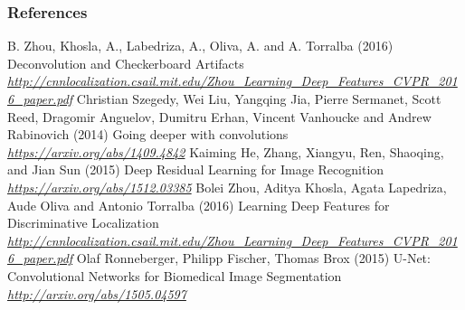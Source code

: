 
\begin{vbframe}
\frametitle{References}
\footnotesize{
\begin{thebibliography}{99}

 B. Zhou, Khosla, A., Labedriza, A., Oliva, A. and A. Torralba (2016)
\newblock Deconvolution and Checkerboard Artifacts
\newblock \emph{\url{http://cnnlocalization.csail.mit.edu/Zhou_Learning_Deep_Features_CVPR_2016_paper.pdf}}
 Christian Szegedy, Wei Liu, Yangqing Jia, Pierre Sermanet, Scott Reed, Dragomir Anguelov, Dumitru Erhan, Vincent Vanhoucke and Andrew Rabinovich (2014)
\newblock Going deeper with convolutions
\newblock \emph{\url{https://arxiv.org/abs/1409.4842}}
 Kaiming He, Zhang, Xiangyu, Ren, Shaoqing, and Jian Sun (2015)
\newblock Deep Residual Learning for Image Recognition
\newblock \emph{\url{https://arxiv.org/abs/1512.03385}}
 Bolei Zhou, Aditya Khosla, Agata Lapedriza, Aude Oliva and Antonio Torralba (2016)
\newblock Learning Deep Features for Discriminative Localization
\newblock \emph{\url{http://cnnlocalization.csail.mit.edu/Zhou_Learning_Deep_Features_CVPR_2016_paper.pdf}}
 Olaf Ronneberger, Philipp Fischer, Thomas Brox (2015)
\newblock U-Net: Convolutional Networks for Biomedical Image Segmentation
\newblock \emph{\url{http://arxiv.org/abs/1505.04597}}




\end{thebibliography}
}
\end{vbframe}
\endlecture


